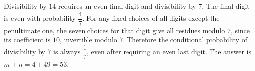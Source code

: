 Divisibility by $14$ requires an even final digit and divisibility by $7$. The final digit is even with probability $\dfrac{4}{7}$. For any fixed choices of all digits except the penultimate one, the seven choices for that digit give all residues modulo $7$, since its coefficient is $10$, invertible modulo $7$. Therefore the conditional probability of divisibility by $7$ is always $\dfrac{1}{7}$, even after requiring an even last digit. The answer is $m+n=4+49=\boxed{53}$.
